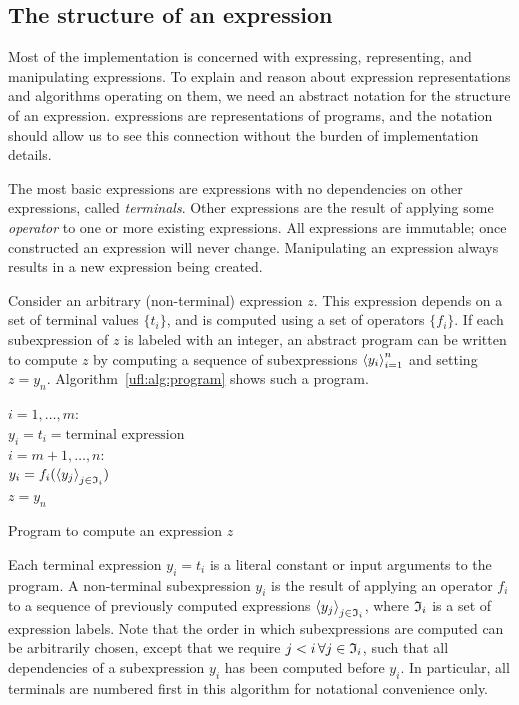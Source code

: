\subsection{The structure of an expression} \label{ufl:sec:expressions}

Most of the \ufl{} implementation is concerned with expressing,
representing, and manipulating expressions.  To explain and reason
about expression representations and algorithms operating on them, we
need an abstract notation for the structure of an expression.  \ufl{}
expressions are representations of programs, and the notation should
allow us to see this connection without the burden of implementation
details.

The most basic \ufl{} expressions are expressions with no dependencies
on other expressions, called \emph{terminals}.  Other expressions are
the result of applying some \emph{operator} to one or more existing
expressions.  All expressions are immutable; once constructed an
expression will never change. Manipulating an expression always
results in a new expression being created.

Consider an arbitrary (non-terminal) expression $z$.  This expression
depends on a set of terminal values $\{ t_i \}$, and is computed using
a set of operators $\{ f_i \}$.  If each subexpression of $z$ is
labeled with an integer, an abstract program can be written to compute
$z$ by computing a sequence of subexpressions $\left\langle{y_i}\right\rangle_{i=1}^n$ and
setting $z = y_n$.  Algorithm~\ref{ufl:alg:program} shows such a
program.

\begin{algorithm}
\afor $i = 1, \ldots, m$:\\
\tab $ y_i =  t_i = \mbox{terminal expression}$ \\
\afor $i = m+1, \ldots, n$:\\
\tab $ y_i =  f_i(\left\langle{y_j}\right\rangle_{j\in\mathfrak{I}_i})$ \\
$z = y_n$
\caption{Program to compute an expression $z$}
\label{ufl:alg:program}
\end{algorithm}

Each terminal expression $y_i = t_i$ is a literal constant or input
arguments to the program.  A non-terminal subexpression $y_i$ is the
result of applying an operator $f_i$ to a sequence of previously
computed expressions $\left\langle{y_j}\right\rangle_{j\in\mathfrak{I}_i}$, where $\mathfrak{I}_i$ is a set
of expression labels.  Note that the order in which subexpressions are
computed can be arbitrarily chosen, except that we require $j < i \,
\forall j \in \mathfrak{I}_i$, such that all dependencies of a subexpression
$y_i$ has been computed before $y_i$.  In particular, all terminals
are numbered first in this algorithm for notational convenience only.

